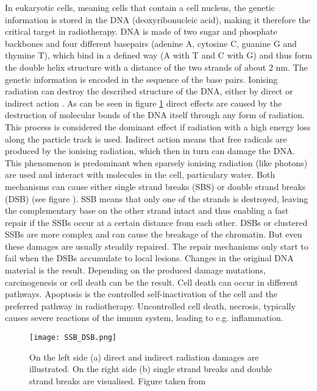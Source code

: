\documentclass[type=dr, dr=rernat, accentcolor=tud7b,colorbacktitle, bigchapter, openright, twoside, 12pt ]{tudthesis}
\begin{document}
In eukaryotic cells, meaning cells that contain a cell nucleus, the genetic information is stored in the DNA (deoxyribonucleic acid), 
making it therefore the critical target in radiotherapy. DNA is made of two sugar and phosphate backbones and four different basepairs 
(adenine A, cytosine C, guanine G and thymine T), which bind in a defined way (A with T and C with G) and thus form the double helix 
structure with a distance of the two strands of about 2 nm. The genetic information is encoded in the sequence of the base pairs. 
Ionising radiation can destroy the described structure of the DNA, either by direct or indirect action \cite{Hal06}.\newline
\newline
As can be seen in figure \ref{ida} direct effects are caused by the destruction of molecular bonds of the DNA itself 
through any form of radiation. This process is considered the dominant effect if radiation with a high energy loss along the particle 
track is used. Indirect action means that free radicals are produced by the ionising radiation, which then in turn can damage the DNA. 
This phenomenon is predominant when sparsely ionising radiation (like photons) are used and interact with molecules in the cell, 
particulary water.\newline
\newline
Both mechanisms can cause either single strand breaks (SBS) or double strand breaks (DSB) (see figure \label{ida}). SSB means that only 
one of the strands is destroyed, leaving the complementary base on the other strand intact and thus enabling a fast repair if the SSBs 
occur at a certain distance from each other. DSBs or clustered SSBs are more complex and can cause the breakage of the chromatin. But even 
these damages are usually steadily repaired. The repair mechanisms only start to fail when the DSBs accumulate to local lesions. Changes 
in the original DNA material is the result. Depending on the produced damage mutations, carcinogenesis or cell death can be the 
result. Cell death can occur in different pathways. Apoptosis is the controlled self-inactivation of the cell and the preferred 
pathway in radiotherapy. Uncontrolled cell death, necrosis, typically causes severe reactions of the immun system, leading to e.g. 
inflammation.

\begin{figure}[H]
\begin{center}
\texttt{[image: SSB\_DSB.png]}
\caption{On the left side (a) direct and indirect radiation damages are illustrated. On the right side (b) single strand breaks and 
double strand breaks are visualised. Figure taken from \cite{Ric12}}
\label{ida}
\end{center}
\end{figure}
\end{document}
